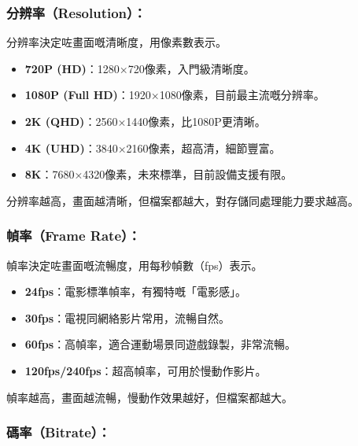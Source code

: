 


\subsubsection*{分辨率（Resolution）：}

分辨率決定咗畫面嘅清晰度，用像素數表示。

\begin{itemize}
  \item \textbf{720P (HD)}：1280×720像素，入門級清晰度。
  \item \textbf{1080P (Full HD)}：1920×1080像素，目前最主流嘅分辨率。
  \item \textbf{2K (QHD)}：2560×1440像素，比1080P更清晰。
  \item \textbf{4K (UHD)}：3840×2160像素，超高清，細節豐富。
  \item \textbf{8K}：7680×4320像素，未來標準，目前設備支援有限。
\end{itemize}

分辨率越高，畫面越清晰，但檔案都越大，對存儲同處理能力要求越高。

\subsubsection*{幀率（Frame Rate）：}

幀率決定咗畫面嘅流暢度，用每秒幀數（fps）表示。

\begin{itemize}
  \item \textbf{24fps}：電影標準幀率，有獨特嘅「電影感」。
  \item \textbf{30fps}：電視同網絡影片常用，流暢自然。
  \item \textbf{60fps}：高幀率，適合運動場景同遊戲錄製，非常流暢。
  \item \textbf{120fps/240fps}：超高幀率，可用於慢動作影片。
\end{itemize}

幀率越高，畫面越流暢，慢動作效果越好，但檔案都越大。

\subsubsection*{碼率（Bitrate）：}

